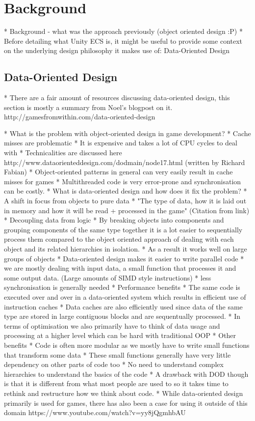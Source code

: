 \section{Background}
* Background - what was the approach previously (object oriented design :P)
* Before detailing what Unity ECS is, it might be useful to provide some context on the underlying design philosophy it makes use of: Data-Oriented Design

\subsection{Data-Oriented Design}
* There are a fair amount of resources discussing data-oriented design, this section is mostly a summary from Noel's blogpost on it. http://gamesfromwithin.com/data-oriented-design

* What is the problem with object-oriented design in game development?
   * Cache misses are problematic
      * It is expensive and takes a lot of CPU cycles to deal with
      * Technicalities are discussed here http://www.dataorienteddesign.com/dodmain/node17.html (written by Richard Fabian)
      * Object-oriented patterns in general can very easily result in cache misses for games
   * Multithreaded code is very error-prone and synchronisation can be costly. 
* What is data-oriented design and how does it fix the problem? 
   * A shift in focus from objects to pure data
      * "The type of data, how it is laid out in memory and how it will be read + processed in the game" (Citation from link)
      * Decoupling data from logic
   * By breaking objects into components and grouping components of the same type together it is a lot easier to sequentially process them compared to the object oriented approach of dealing with each object and its related hierarchies in isolation. 
   * As a result it works well on large groups of objects
   * Data-oriented design makes it easier to write parallel code
      * we are mostly dealing with input data, a small function that processes it and some output data. (Large amounts of SIMD style instructions)
      * less synchronisation is generally needed
   * Performance benefits
    * The same code is executed over and over in a data-oriented system which results in efficient use of instruction caches
    * Data caches are also efficiently used since data of the same type are stored in large contiguous blocks and are sequentually processed. 
    * In terms of optimisation we also primarily have to think of data usage and processing at a higher level which can be hard with traditional OOP
   * Other benefits
    * Code is often more modular as we mostly have to write small functions that transform some data
       * These small functions generally have very little dependency on other parts of code too
       * No need to understand complex hierarchies to understand the basics of the code
   * A drawback with DOD though is that it is different from what most people are used to so it takes time to rethink and restructure how we think about code. 
   * While data-oriented design primarily is used for games, there has also been a case for using it outside of this domain https://www.youtube.com/watch?v=yy8jQgmhbAU
